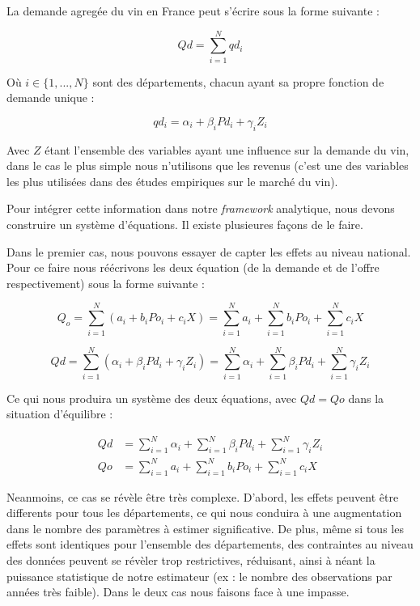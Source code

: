 \documentclass[11pt,]{article}
\begin{document}
La demande agregée du vin en France peut s'écrire sous la forme suivante
:

\begin{equation*}
    Qd = \sum_{i = 1}^{N} qd_i 
\end{equation*}

Où \(i \in \{1, ..., N\}\) sont des départements, chacun ayant sa propre
fonction de demande unique :

\begin{equation*}
    qd_i = \alpha_i + \beta_i Pd_i + \gamma_i Z_i 
\end{equation*}

Avec \(Z\) étant l'ensemble des variables ayant une influence sur la
demande du vin, dans le cas le plus simple nous n'utilisons que les
revenus (c'est une des variables les plus utilisées dans des études
empiriques sur le marché du vin).

Pour intégrer cette information dans notre \emph{framework} analytique,
nous devons construire un système d'équations. Il existe plusieures
façons de le faire.

Dans le premier cas, nous pouvons essayer de capter les effets au niveau
national. Pour ce faire nous réécrivons les deux équation (de la demande
et de l'offre respectivement) sous la forme suivante :

\begin{equation*}
    Q_o = \sum_{i = 1}^{N} (a_i + b_i Po_i + c_i X) = \sum_{i = 1}^{N} a_i + \sum_{i = 1}^{N} b_i Po_i + \sum_{i = 1}^{N} c_i X
\end{equation*}

\begin{equation*}
    Qd = \sum_{i = 1}^{N} ( \alpha_i + \beta_i Pd_i + \gamma_i Z_i ) = \sum_{i = 1}^{N} \alpha_i + \sum_{i = 1}^{N} \beta_i Pd_i + \sum_{i = 1}^{N} \gamma_i Z_i
\end{equation*}

Ce qui nous produira un système des deux équations, avec \(Qd = Qo\)
dans la situation d'équilibre :

\begin{align*}
    Qd & = \sum_{i = 1}^{N} \alpha_i + \sum_{i = 1}^{N} \beta_i Pd_i + \sum_{i = 1}^{N} \gamma_i Z_i \\
    Qo & = \sum_{i = 1}^{N} a_i + \sum_{i = 1}^{N} b_i Po_i + \sum_{i = 1}^{N} c_i X
\end{align*}

Neanmoins, ce cas se révèle être très complexe. D'abord, les effets
peuvent être differents pour tous les départements, ce qui nous conduira
à une augmentation dans le nombre des paramètres à estimer
significative. De plus, même si tous les effets sont identiques pour
l'ensemble des départements, des contraintes au niveau des données
peuvent se révèler trop restrictives, réduisant, ainsi à néant la
puissance statistique de notre estimateur (ex : le nombre des
observations par années très faible). Dans le deux cas nous faisons face
à une impasse.
\end{document}
